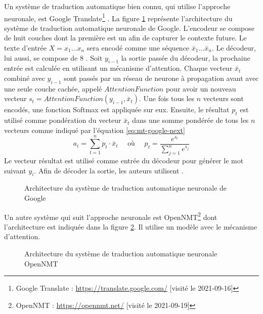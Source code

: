 \documentclass{KodeBook}
\begin{document}
Un système de traduction automatique bien connu, qui utilise l'approche neuronale, est Google Translate\footnote{Google Translate : \url{https://translate.google.com/} [visité le 2021-09-16]} \cite{2016-wu-al}.
La figure \ref{fig:mt-google} représente l'architecture du système de traduction automatique neuronale de Google. 
L'encodeur se compose de huit couches  dont la première est un  afin de capturer le contexte future. 
Le texte d'entrée $X = x_1 \ldots x_n$ sera encodé comme une séquence $\bar{x}_1 \ldots \bar{x}_n$. 
Le décodeur, lui aussi, se compose de 8 .
Soit $y_{i-1}$ la sortie passée du décodeur, la prochaine entrée est calculée en utilisant un mécanisme d'attention. 
Chaque vecteur $\bar{x}_t$ combiné avec $y_{i-1}$ sont passés par un réseau de neurone à propagation avant avec une seule couche cachée, appelé $AttentionFunction$ pour avoir un nouveau vecteur $s_t = AttentionFunction(y_{i-1}, \bar{x}_t)$. 
Une fois tous les $n$ vecteurs sont encodés, une fonction Softmax est appliquée sur eux.
Ensuite, le résultat $p_t$ est utilisé comme pondération du vecteur $\bar{x}_t$ dans une somme pondérée de tous les $n$ vecteurs comme indiqué par l'équation \ref{eq:mt-google-next}
\begin{equation}\label{eq:mt-google-next}
a_i = \sum_{t=1}^{n} p_t \cdot \bar{x}_t \quad \text{ où }\quad p_t = \frac{e^{s_t}}{\sum_{j=1}^n e^{s_j}}
\end{equation}
Le vecteur résultat est utilisé comme entrée du décodeur pour générer le mot suivant $y_i$.
Afin de décoder la sortie, les auteurs utilisent .

\begin{figure}[!ht]
	\centering
	\caption[Architecture de Google Translate (traduction automatique)]{Architecture du système de traduction automatique neuronale de Google \cite{2016-wu-al}}
	\label{fig:mt-google}
\end{figure}

Un autre système qui suit l'approche neuronale est OpenNMT\footnote{OpenNMT : \url{https://opennmt.net/} [visité le 2021-09-19]} \cite{17-klein-al} dont l'architecture est indiquée dans la figure \ref{fig:mt-opennmt}.
Il utilise un modèle  avec le mécanisme d'attention.

\begin{figure}[!ht]
	\centering
	\caption[Architecture de OpenNMT (traduction automatique)]{Architecture du système de traduction automatique neuronale OpenNMT \cite{17-klein-al}}
	\label{fig:mt-opennmt}
\end{figure}
\end{document}
